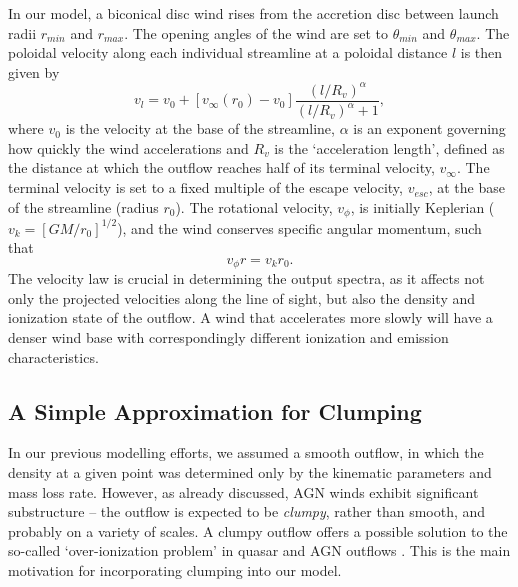 \documentclass[useAMS,usenatbib]{mn2e_x}
\begin{document}
In our model, a biconical disc wind rises from the accretion 
disc between launch radii $r_{min}$ and $r_{max}$.
The opening angles of the wind are set to $\theta_{min}$ and $\theta_{max}$.
The poloidal velocity along each individual streamline at a poloidal distance $l$ 
is then given by
\begin{equation}
v_l=v_0+\left[v_{\infty}(r_0)-v_0\right]\frac{\left(l/R_v\right)^{\alpha}}{\left(l/R_v\right)^{\alpha}+1},
\label{v_law}
\end{equation}
where $v_0$ is the velocity at the base of the streamline, $\alpha$ is
an exponent governing how quickly the wind accelerations and 
$R_v$ is the `acceleration length', defined as the distance at which
the outflow reaches half of its terminal velocity, $v_{\infty}$.
The terminal velocity is set to a fixed multiple of the escape
velocity, $v_{esc}$, at the base of the streamline (radius $r_0$).
The rotational velocity, $v_{\phi}$, is initially Keplerian ($v_k = [GM/r_0]^{1/2}$),
and the wind conserves specific angular momentum, such that 
\begin{equation}
v_{\phi} r = v_k r_0.
\label{v_law}
\end{equation}
The velocity law is crucial in determining the output spectra,
as it affects not only the projected velocities along the line of sight,
but also the density and ionization state of the outflow.
A wind that accelerates more slowly will have a denser wind base
with correspondingly different ionization and emission characteristics.

\subsection{A Simple Approximation for Clumping}

In our previous modelling efforts, we assumed a smooth outflow, 
in which the density at a given point was determined only by the 
kinematic parameters and mass loss rate. However, as already discussed,
AGN winds exhibit significant substructure -- the outflow is expected to be
{\em clumpy}, rather than smooth, and probably on a variety of scales. 
A clumpy outflow offers a possible solution to the so-called `over-ionization problem' in 
quasar and AGN outflows \citep{hamann2013}. This is the main motivation for incorporating 
clumping into our model.
\end{document}
